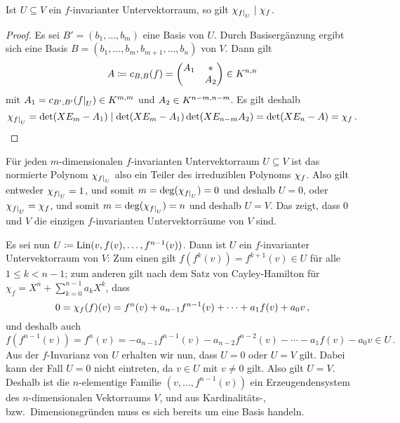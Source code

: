 \begin{lemma}
  Ist $U \subseteq V$ ein $f$-invarianter Untervektorraum, so gilt $\charpol{\restrict{f}{U}} \divides \charpol{f}$.
\end{lemma}

\begin{proof}
  Es sei $B' = (b_1, \dotsc, b_m)$ eine Basis von $U$.
  Durch Basisergänzung ergibt sich eine Basis $B = (b_1, \dotsc, b_m, b_{m+1}, \dotsc, b_n)$ von $V$.
  Dann gilt
  \[
              A
    \defined  \repmatrixendo{f}{B}
    =         \begin{pmatrix}
                A_1 & *   \\
                    & A_2
              \end{pmatrix}
    \in       \matrices{n}{K}
  \]
  mit $A_1 = \repmatrixendo{\restrict{f}{U}}{B'} \in \matrices{m}{K}$ und $A_2 \in \matrices{n-m}{K}$.
  Es gilt deshalb
  \[
              \charpol{\restrict{f}{U}}
    =         \det(X E_m - A_1)
    \divides  \det(X E_m - A_1) \det(X E_{n-m} A_2)
    =         \det(X E_n - A)
    =         \charpol{f} \,.
  \]
\end{proof}

Für jeden $m$-dimensionalen $f$-invarianten Untervektorraum $U \subseteq V$ ist das normierte Polynom $\charpol{\restrict{f}{U}}$ also ein Teiler des irreduziblen Polynoms $\charpol{f}$.
Also gilt entweder $\charpol{\restrict{f}{U}} = 1$, und somit $m = \deg(\charpol{\restrict{f}{U}}) = 0$ und deshalb $U = 0$, oder $\charpol{\restrict{f}{U}} = \charpol{f}$, und somit $m = \deg(\charpol{\restrict{f}{U}}) = n$ und deshalb $U = V$.
Das zeigt, dass $0$ und $V$ die einzigen $f$-invarianten Untervektorräume von $V$ sind.

Es sei nun $U \defined \Lin(v, f(v), \dotsc, f^{n-1}(v))$.
Dann ist $U$ ein $f$-invarianter Untervektorraum von $V$:
Zum einen gilt $f(f^k(v)) = f^{k+1}(v) \in U$ für alle $1 \leq k < n-1$;
zum anderen gilt nach dem Satz von Cayley-Hamilton für $\chi_f = X^n + \sum_{k=0}^{n-1} a_k X^k$, dass
\[
    0
  = \charpol{f}(f)(v)
  = f^n(v) + a_{n-1} f^{n-1}(v) + \dotsb + a_1 f(v) + a_0 v \,,
\]
und deshalb auch
\[
    f(f^{n-1}(v))
  = f^n(v)
  = - a_{n-1} f^{n-1}(v) - a_{n-2} f^{n-2}(v) - \dotsb - a_1 f(v) - a_0 v
  \in U \,.
\]
Aus der $f$-Invarianz von $U$ erhalten wir nun, dass $U = 0$ oder $U = V$ gilt.
Dabei kann der Fall $U = 0$ nicht eintreten, da $v \in U$ mit $v \neq 0$ gilt.
Also gilt $U = V$.
Deshalb ist die $n$-elementige Familie $(v, \dotsc, f^{n-1}(v))$ ein Erzeugendensystem des $n$-dimensionalen Vektorraums $V$, und aus Kardinalitäts-, bzw.\ Dimensionsgründen muss es sich bereits um eine Basis handeln.




